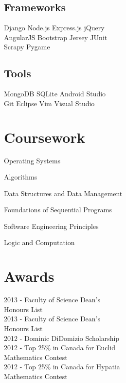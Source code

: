 \documentclass[letterpaper]{deedy-resume}
\begin{document}
\begin{minipage}[t]{0.33\textwidth}
\sectionspace %
\subsection{Frameworks}

Django \textbullet{} Node.js \textbullet{} Express.js \textbullet{} jQuery  \\
AngularJS \textbullet{} Bootstrap \textbullet{} Jersey \textbullet{} JUnit \\ 
Scrapy \textbullet{} Pygame

\sectionspace

\subsection{Tools}

MongoDB \textbullet{} SQLite \textbullet{} Android Studio\\
Git \textbullet{} Eclipse \textbullet{} Vim \textbullet{} Visual Studio
\sectionspace

\section{Coursework}
\vspace{\topsep}
\begin{tightitemize}
\item Operating Systems
\item Algorithms
\item Data Structures and Data Management
\item Foundations of Sequential Programs
\item Software Engineering Principles
\item Logic and Computation
\end{tightitemize}
\sectionspace

\section{Awards}
2013 - Faculty of Science Dean's\\
\hspace{1.05cm}Honours List\\
2013 - Faculty of Science Dean's\\
\hspace{1.05cm}Honours List\\
2012 - Dominic DiDomizio Scholarship\\
2012 - Top 25\% in Canada for Euclid\\
\hspace{1.05cm}Mathematics Contest\\
2012 - Top 25\% in Canada for Hypatia\\
\hspace{1.05cm}Mathematics Contest
\sectionspace

\end{minipage} %
\end{document}
